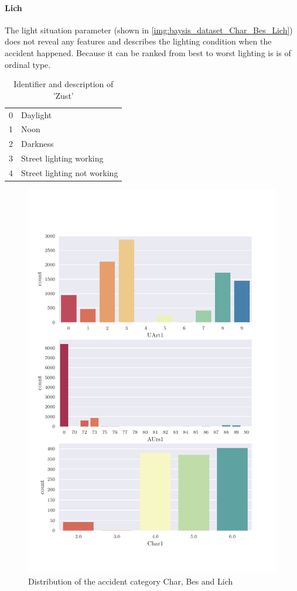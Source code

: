 \paragraph{Lich}
The light situation parameter (shown in \autoref{img:baysis_dataset_Char_Bes_Lich}) does not reveal any features and describes the lighting condition when the accident happened. Because it can be ranked from best to worst lighting is is of ordinal type.
\noindent
\begin{table}[ht]
	\centering
	\begin{tabular}{c|l}  
	0 & Daylight \\
    1 & Noon \\
    2 & Darkness \\
    3 & Street lighting working \\
    4 & Street lighting not working \\
	\end{tabular}
	\caption{Identifier and description of 'Zust'}
	\label{table:baysis_dataset_Zust}
\end{table} 

\clearpage
\begin{figure}[!ht]
	\centering
	\includegraphics[scale=0.7, trim=0cm 1.5cm 0cm 1cm]{CorrAnalysis/data/BAYSIS/01_dataset/plots/baysis_dataset_count_multiple03}
	\caption{Distribution of the accident category Char, Bes and Lich}
	\label{img:baysis_dataset_Char_Bes_Lich}
\end{figure}
\clearpage

